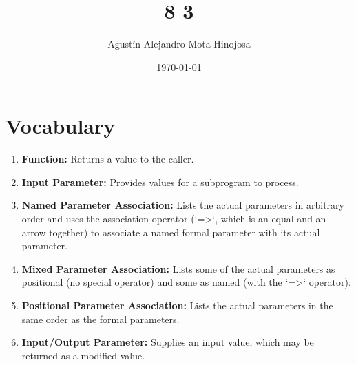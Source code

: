 \documentclass[11pt]{article}
\author{Agustín Alejandro Mota Hinojosa}
\date{\today}
\title{8 3}
\begin{document}
\maketitle
\tableofcontents

\section{Vocabulary}
\label{sec:orgf4d25d3}
\begin{enumerate}
\item \textbf{Function:} Returns a value to the caller.

\item \textbf{Input Parameter:} Provides values for a subprogram to process.

\item \textbf{Named Parameter Association:} Lists the actual parameters in arbitrary order and uses the association operator (`=>`, which is an equal and an arrow together) to associate a named formal parameter with its actual parameter.

\item \textbf{Mixed Parameter Association:} Lists some of the actual parameters as positional (no special operator) and some as named (with the `=>` operator).

\item \textbf{Positional Parameter Association:} Lists the actual parameters in the same order as the formal parameters.

\item \textbf{Input/Output Parameter:} Supplies an input value, which may be returned as a modified value.
\end{enumerate}
\end{document}
